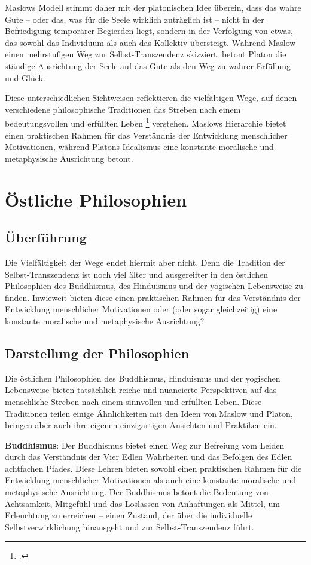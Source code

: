 \documentclass[12pt,a4paper]{article}
\begin{document}
Maslows Modell stimmt daher mit der platonischen Idee überein, dass das wahre Gute – oder das, was für die Seele wirklich zuträglich ist – nicht in der Befriedigung temporärer Begierden liegt, sondern in der Verfolgung von etwas, das sowohl das Individuum als auch das Kollektiv übersteigt. Während Maslow einen mehrstufigen Weg zur Selbst-Transzendenz skizziert, betont Platon die ständige Ausrichtung der Seele auf das Gute als den Weg zu wahrer Erfüllung und Glück.

Diese unterschiedlichen Sichtweisen reflektieren die vielfältigen Wege, auf denen verschiedene philosophische Traditionen das Streben nach einem bedeutungsvollen und erfüllten Leben \footcite{rahula1974, flood1996, feuerstein2001} verstehen. Maslows Hierarchie bietet einen praktischen Rahmen für das Verständnis der Entwicklung menschlicher Motivationen, während Platons Idealismus eine konstante moralische und metaphysische Ausrichtung betont.

\section{Östliche Philosophien}
\subsection[short]{Überführung}
Die Vielfältigkeit der Wege endet hiermit aber nicht. Denn die Tradition der Selbst-Transzendenz ist noch viel älter und ausgereifter in den östlichen Philosophien des Buddhismus, des Hinduismus und der yogischen Lebensweise zu finden. Inwieweit bieten diese einen praktischen Rahmen für das Verständnis der Entwicklung menschlicher Motivationen oder (oder sogar gleichzeitig) eine konstante moralische
und metaphysische Ausrichtung?

\subsection[short]{Darstellung der Philosophien}
Die östlichen Philosophien des Buddhismus, Hinduismus und der yogischen Lebensweise bieten tatsächlich reiche und nuancierte Perspektiven auf das menschliche Streben nach einem sinnvollen und erfüllten Leben. Diese Traditionen teilen einige Ähnlichkeiten mit den Ideen von Maslow und Platon, bringen aber auch ihre eigenen einzigartigen Ansichten und Praktiken ein.

\textbf{Buddhismus}:
Der Buddhismus bietet einen Weg zur Befreiung vom Leiden durch das Verständnis der Vier Edlen Wahrheiten und das Befolgen des Edlen achtfachen Pfades. Diese Lehren bieten sowohl einen praktischen Rahmen für die Entwicklung menschlicher Motivationen als auch eine konstante moralische und metaphysische Ausrichtung. Der Buddhismus betont die Bedeutung von Achtsamkeit, Mitgefühl und das Loslassen von Anhaftungen als Mittel, um Erleuchtung zu erreichen – einen Zustand, der über die individuelle Selbstverwirklichung hinausgeht und zur Selbst-Transzendenz führt.
\end{document}
